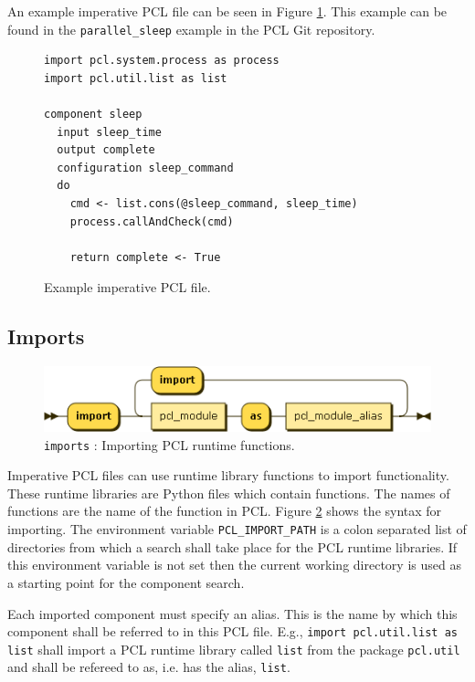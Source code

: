 An example imperative PCL file can be seen in Figure \ref{fig:imperative-pcl-example}. This example can be found in the \texttt{parallel\_sleep} example in the PCL Git repository.
\begin{figure}[h!]
  \begin{verbatim}
import pcl.system.process as process
import pcl.util.list as list

component sleep
  input sleep_time
  output complete
  configuration sleep_command
  do
    cmd <- list.cons(@sleep_command, sleep_time)
    process.callAndCheck(cmd)

    return complete <- True
  \end{verbatim}
  \caption{Example imperative PCL file.}
  \label{fig:imperative-pcl-example}
\end{figure}

\subsection{Imports}
\begin{figure}[h!]
  \centering
    \includegraphics[scale=\DiagramScale]{chapters/adapter/diagrams/imports}
  \caption{\texttt{imports} : Importing PCL runtime functions.}
  \label{fig:imperative-pcl-imports}
\end{figure}
Imperative PCL files can use runtime library functions to import functionality. These runtime libraries are Python files which contain functions. The names of functions are the name of the function in PCL. Figure \ref{fig:imperative-pcl-imports} shows the syntax for importing. The environment variable \texttt{PCL\_IMPORT\_PATH} is a colon separated list of directories from which a search shall take place for the PCL runtime libraries. If this environment variable is not set then the current working directory is used as a starting point for the component search.

Each imported component must specify an alias. This is the name by which this component shall be referred to in this PCL file. E.g., \texttt{import pcl.util.list as list} shall import a PCL runtime library called \texttt{list} from the package \texttt{pcl.util} and shall be refereed to as, i.e. has the alias, \texttt{list}.

